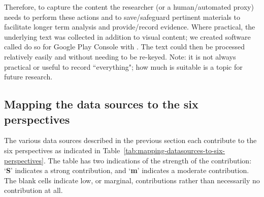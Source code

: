 Therefore, to capture the content the researcher (or a human/automated proxy) needs to perform these actions and to save/safeguard pertinent materials to facilitate longer term analysis and provide/record evidence. Where practical, the underlying text was collected in addition to visual content; we created software called  do so for Google Play Console with . The text could then be processed relatively easily and without needing to be re-keyed. Note: it is not always practical or useful to record ``everything"; how much is suitable is a topic for future research. 

\subsection{Mapping the data sources to the six perspectives}
The various data sources described in the previous section each contribute to the six perspectives as indicated in Table~\ref{tab:mapping-datasources-to-six-perspectives}. The table has two indications of the strength of the contribution: `\textbf{S}' indicates a strong contribution, and `\textbf{m}' indicates a moderate contribution. The blank cells indicate low, or marginal, contributions rather than necessarily no contribution at all.

